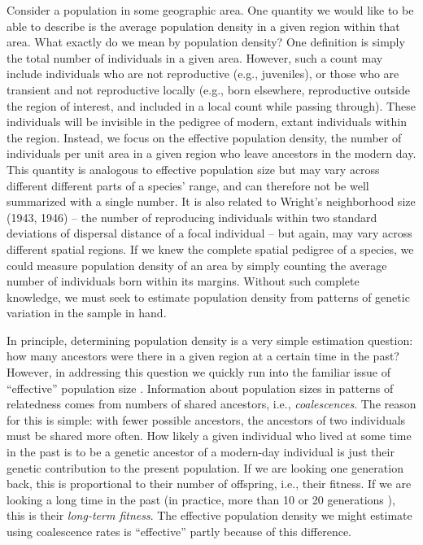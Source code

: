 \documentclass{ar-1col}
\begin{document}
Consider a population in some geographic area. 
One quantity we would like to be able to describe 
is the average population density in a given region within that area.
What exactly do we mean by population density?
One definition is simply the total number of individuals in a given area.
However, such a count may include 
individuals who are not reproductive (e.g., juveniles), 
or those who are transient and not reproductive locally 
(e.g., born elsewhere, reproductive outside the region of interest, 
and included in a local count while passing through).
These individuals will be invisible in the pedigree 
of modern, extant individuals within the region.
Instead, we focus on the effective population density, 
the number of individuals per unit area in a given region 
who leave ancestors in the modern day.
This quantity is analogous to effective population size 
but may vary across different different parts of a species' range, 
and can therefore not be well summarized with a single number.
It is also related to Wright's neighborhood size (1943, 1946) -- 
the number of reproducing individuals within two standard deviations 
of dispersal distance of a focal individual -- 
but again, may vary across different spatial regions.
If we knew the complete spatial pedigree of a species, 
we could measure population density of an area 
by simply counting the average number of individuals born within its margins.
Without such complete knowledge, 
we must seek to estimate population density from patterns of genetic variation 
in the sample in hand.

In principle, determining population density is a very simple estimation question:
how many ancestors were there in a given region at a certain time in the past?
However, in addressing this question we quickly run into the familiar
issue of ``effective'' population size \cite{CharlesworthCharlesworthBarton2003}.
Information about population sizes in patterns of relatedness
comes from numbers of shared ancestors, i.e., \textit{coalescences}.
The reason for this is simple:
with fewer possible ancestors, the ancestors of two individuals
must be shared more often.
How likely a given individual who lived at some time in the past
is to be a genetic ancestor of a modern-day individual
is just their genetic contribution to the present population.
If we are looking one generation back, 
this is proportional to their number of offspring, i.e., their fitness.
If we are looking a long time in the past
(in practice, more than 10 or 20 generations \cite{bartonfitness}),
this is their \textit{long-term fitness}.
The effective population density we might estimate using coalescence rates
is ``effective'' partly because of this difference.
\end{document}
